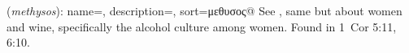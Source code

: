 \item[Drunkenness (women),]

(\textit{methysos}):
{
    name=,
    description={},
    sort=μεθυσος@
}
See , same but about women and wine, specifically the alcohol culture among women.
Found in 1~Cor 5:11, 6:10.
